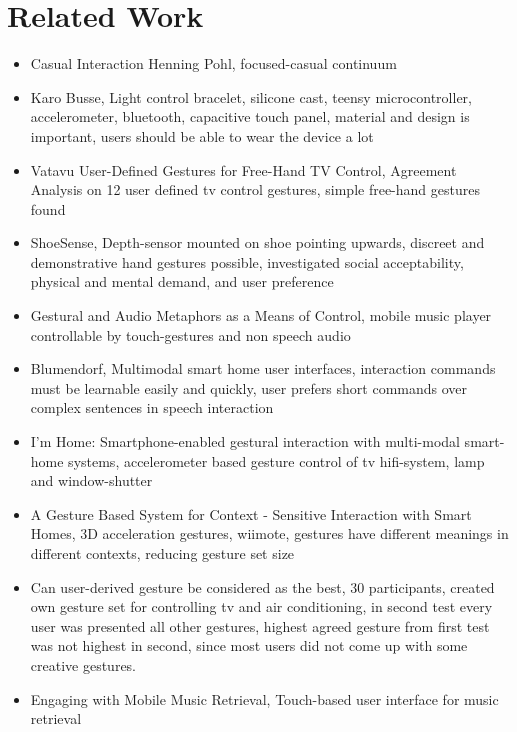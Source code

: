 \chapter{Related Work}\label{ch:relatedwork}

\begin{itemize}
\item{
	Casual Interaction Henning Pohl, focused-casual continuum
}
\item{
	Karo Busse, Light control bracelet,
	silicone cast, teensy microcontroller, accelerometer, bluetooth, capacitive touch panel,
	material and design is important, users should be able to wear the device a lot
}
\item{
	Vatavu User-Defined Gestures for Free-Hand TV Control,
	Agreement Analysis on 12 user defined tv control gestures,
	simple free-hand gestures found
}
\item{
	ShoeSense, Depth-sensor mounted on shoe pointing upwards,
	discreet and demonstrative hand gestures possible,
	investigated social acceptability, physical and mental demand, and user preference
}
\item{
	Gestural and Audio Metaphors as a Means of Control,
	mobile music player controllable by touch-gestures and non speech audio
}
\item{
	Blumendorf, Multimodal smart home user interfaces,
	interaction commands must be learnable easily and quickly, user prefers short commands over complex sentences in speech interaction
}
\item{
	I'm Home: Smartphone-enabled gestural interaction with multi-modal smart-home systems,
	accelerometer based gesture control of tv hifi-system, lamp and window-shutter
}
\item{
	A Gesture Based System for Context - Sensitive Interaction with Smart Homes,
	3D acceleration gestures, wiimote, gestures have different meanings in different contexts, reducing gesture set size
}
\item{
	Can user-derived gesture be considered as the best,
	30 participants, created own gesture set for controlling tv and air conditioning, in second test every user was presented all other gestures, highest agreed gesture from first test was not highest in second, since most users did not come up with some creative gestures.
}
\item{
	Engaging with Mobile Music Retrieval,
	Touch-based user interface for music retrieval
}

\end{itemize}

